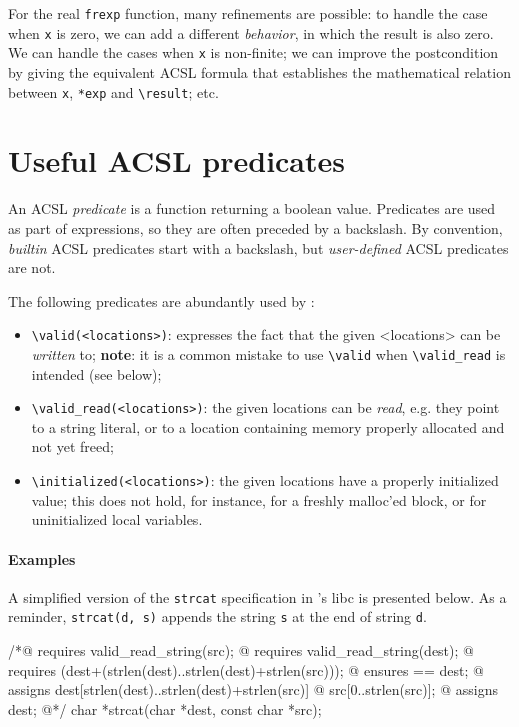 \documentclass{frama-c-book}
\begin{document}
For the real \texttt{frexp} function, many refinements are possible: to handle
the case when \texttt{x} is zero, we can add a different {\em behavior},
in which the result is also zero. We can handle the cases when \texttt{x} is
non-finite; we can improve the postcondition by giving the equivalent ACSL
formula that establishes the mathematical relation between \texttt{x},
\texttt{*exp} and \verb+\result+; etc.

\section{Useful ACSL predicates}

An ACSL {\em predicate} is a function returning a boolean value.
Predicates are used as part of expressions, so they are often preceded
by a backslash. By convention, {\em builtin} ACSL predicates start with
a backslash, but {\em user-defined} ACSL predicates are not.

The following predicates are abundantly used by \Eva{}:
\begin{itemize}
\item \verb+\valid(<locations>)+: expresses the fact that
  the given <locations> can be {\em written} to; \textbf{note}: it is
  a common mistake to use \verb+\valid+ when \verb+\valid_read+ is intended
  (see below);
\item \verb+\valid_read(<locations>)+: the given locations can be {\em read},
  e.g. they point to a string literal, or to a location containing memory
  properly allocated and not yet freed;
\item \verb+\initialized(<locations>)+: the given locations have a properly
  initialized value; this does not hold, for instance, for a freshly
  malloc'ed block, or for uninitialized local variables.

\end{itemize}

\paragraph{Examples}

A simplified version of the \texttt{strcat} specification in \FramaC's libc
is presented below. As a reminder, \verb+strcat(d, s)+ appends the string
\texttt{s} at the end of string \texttt{d}.

\begin{listing-nonumber}
/*@ requires valid_read_string(src);
  @ requires valid_read_string(dest);
  @ requires \valid(dest+(strlen(dest)..strlen(dest)+strlen(src)));
  @ ensures \result == dest;
  @ assigns dest[strlen(dest)..strlen(dest)+strlen(src)]
  @     \from src[0..strlen(src)];
  @ assigns \result \from dest;
  @*/
char *strcat(char *dest, const char *src);
\end{listing-nonumber}
\end{document}
